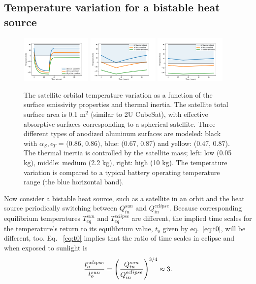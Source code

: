 \documentclass[]{aastex62}
\def\eq#1{\begin{equation} #1 \end{equation}}
\begin{document}
\subsection{Temperature variation for a bistable heat source} 


\begin{figure}[t]
\centering
\includegraphics[width=0.31\textwidth, keepaspectratio]{figures/3tempsVStime_DefaultsMassVariationMsmall.png}
\includegraphics[width=0.31\textwidth, keepaspectratio]{figures/3tempsVStime_DefaultsMassVariationMdefault.png}
\includegraphics[width=0.31\textwidth, keepaspectratio]{figures/3tempsVStime_DefaultsMassVariationMlarge.png}
\caption{The satellite orbital temperature variation as a function of the surface emissivity properties 
and thermal inertia. The satellite total surface area is 0.1 m$^2$ (similar to 2U CubeSat), with 
effective absorptive surfaces corresponding to a spherical satellite. Three different types of anodized 
aluminum surfaces are modeled: black with $\alpha_S, \epsilon_T$  = (0.86, 0.86), blue: (0.67, 0.87)  
and yellow: (0.47, 0.87).  The thermal inertia is controlled by the satellite mass; left: low (0.05 kg), 
middle: medium (2.2 kg), right: high (10 kg). The temperature variation is compared to a typical battery operating 
temperature range (the blue horizontal band).  
\label{fig:Tt}}
\end{figure}


Now consider a bistable heat source, such as a satellite in an orbit and the heat source periodically
switching between $Q_{in}^{sun}$ and $Q_{in}^{eclipse}$. Because corresponding equilibrium temperatures 
$T_{eq}^{sun}$ and $T_{eq}^{eclipse}$ are different, the implied time scales for the temperature's return to its
equilibrium value, $t_o$ given by eq.~\ref{eq:t0}, will be different, too. Eq. ~\ref{eq:t0} implies that
the ratio of time scales in eclipse and when exposed to sunlight is 
\eq{
  { t_o^{eclipse} \over t_o^{sun} }= \left(Q_{in}^{sun} \over Q_{in}^{eclipse} \right)^{3/4} \approx 3. 
}
\end{document}
